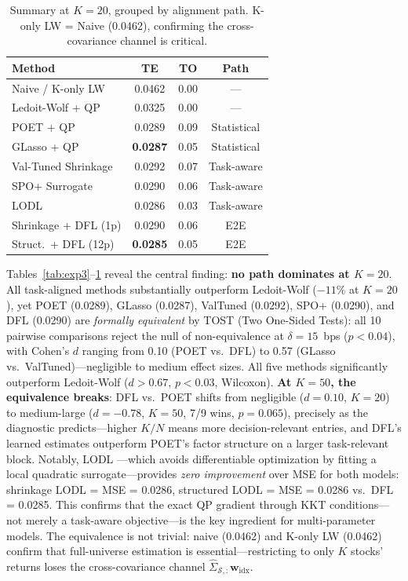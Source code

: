 \documentclass[letterpaper]{article}
\newcommand{\bw}{\mathbf{w}}
\newcommand{\bSigma}{\hat{\Sigma}}
\newcommand{\cS}{\mathcal{S}}
\begin{document}
\begin{table}[t]
\centering
\caption{Summary at $K{=}20$, grouped by alignment path. K-only LW = Naive (0.0462), confirming the cross-covariance channel is critical.}
\label{tab:summary}
\small
\begin{tabular}{@{}lccc@{}}
\toprule
Method & TE & TO & Path \\
\midrule
Naive / K-only LW  & 0.0462 & 0.00 & --- \\
Ledoit-Wolf + QP   & 0.0325 & 0.00 & --- \\
\midrule
POET + QP          & 0.0289 & 0.09 & Statistical \\
GLasso + QP        & \textbf{0.0287} & 0.05 & Statistical \\
\midrule
Val-Tuned Shrinkage & 0.0292 & 0.07 & Task-aware \\
SPO+ Surrogate     & 0.0290 & 0.06 & Task-aware \\
LODL \citep{shah2022decision} & 0.0286 & 0.03 & Task-aware \\
\midrule
Shrinkage + DFL (1p)  & 0.0290 & 0.06 & E2E \\
Struct.\ + DFL (12p)  & \textbf{0.0285} & 0.05 & E2E \\
\bottomrule
\end{tabular}
\end{table}

Tables~\ref{tab:exp3}--\ref{tab:summary} reveal the central finding: \textbf{no path dominates at $K{=}20$}. All task-aligned methods substantially outperform Ledoit-Wolf ($-11\%$ at $K{=}20$), yet POET (0.0289), GLasso (0.0287), ValTuned (0.0292), SPO+ (0.0290), and DFL (0.0290) are \emph{formally equivalent} by TOST (Two One-Sided Tests): all 10 pairwise comparisons reject the null of non-equivalence at $\delta = 15$~bps ($p < 0.04$), with Cohen's $d$ ranging from 0.10 (POET vs.\ DFL) to 0.57 (GLasso vs.\ ValTuned)---negligible to medium effect sizes. All five methods significantly outperform Ledoit-Wolf ($d > 0.67$, $p < 0.03$, Wilcoxon). \textbf{At $K{=}50$, the equivalence breaks}: DFL vs.\ POET shifts from negligible ($d = 0.10$, $K{=}20$) to medium-large ($d = -0.78$, $K{=}50$, 7/9 wins, $p = 0.065$), precisely as the diagnostic predicts---higher $K/N$ means more decision-relevant entries, and DFL's learned estimates outperform POET's factor structure on a larger task-relevant block. Notably, LODL \citep{shah2022decision}---which avoids differentiable optimization by fitting a local quadratic surrogate---provides \emph{zero improvement} over MSE for both models: shrinkage LODL = MSE = 0.0286, structured LODL = MSE = 0.0286 vs.\ DFL = 0.0285. This confirms that the exact QP gradient through KKT conditions---not merely a task-aware objective---is the key ingredient for multi-parameter models. The equivalence is not trivial: naive (0.0462) and K-only LW (0.0462) confirm that full-universe estimation is essential---restricting to only $K$ stocks' returns loses the cross-covariance channel $\bSigma_{\cS,:}\bw_{\text{idx}}$.
\end{document}
